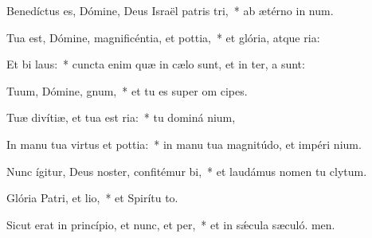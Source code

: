 \item Benedíctus es, Dómine, Deus Israël patris tri,~* ab ætérno in num.
\item Tua est, Dómine, magnificéntia, et pottia,~* et glória, atque ria:
\item Et bi laus:~* cuncta enim quæ in cælo sunt, et in ter, a sunt:
\item Tuum, Dómine, gnum,~* et tu es super om cipes.
\item Tuæ divítiæ, et tua est ria:~* tu dominá nium,
\item In manu tua virtus et pottia:~* in manu tua magnitúdo, et impéri nium.
\item Nunc ígitur, Deus noster, confitémur bi,~* et laudámus nomen tu clytum.
\item Glória Patri, et lio,~* et Spirítu to.
\item Sicut erat in princípio, et nunc, et per,~* et in sǽcula sæculó. men.
